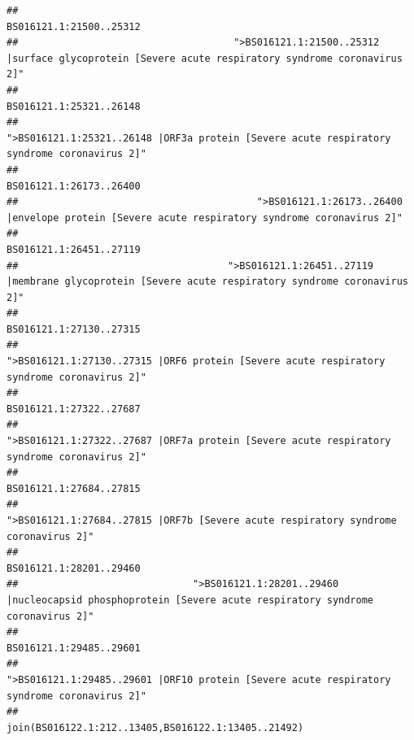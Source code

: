 \documentclass[
]{article}
\begin{document}
\begin{verbatim}
##                                                                                                                BS016121.1:21500..25312 
##                                     ">BS016121.1:21500..25312 |surface glycoprotein [Severe acute respiratory syndrome coronavirus 2]" 
##                                                                                                                BS016121.1:25321..26148 
##                                            ">BS016121.1:25321..26148 |ORF3a protein [Severe acute respiratory syndrome coronavirus 2]" 
##                                                                                                                BS016121.1:26173..26400 
##                                         ">BS016121.1:26173..26400 |envelope protein [Severe acute respiratory syndrome coronavirus 2]" 
##                                                                                                                BS016121.1:26451..27119 
##                                    ">BS016121.1:26451..27119 |membrane glycoprotein [Severe acute respiratory syndrome coronavirus 2]" 
##                                                                                                                BS016121.1:27130..27315 
##                                             ">BS016121.1:27130..27315 |ORF6 protein [Severe acute respiratory syndrome coronavirus 2]" 
##                                                                                                                BS016121.1:27322..27687 
##                                            ">BS016121.1:27322..27687 |ORF7a protein [Severe acute respiratory syndrome coronavirus 2]" 
##                                                                                                                BS016121.1:27684..27815 
##                                                    ">BS016121.1:27684..27815 |ORF7b [Severe acute respiratory syndrome coronavirus 2]" 
##                                                                                                                BS016121.1:28201..29460 
##                              ">BS016121.1:28201..29460 |nucleocapsid phosphoprotein [Severe acute respiratory syndrome coronavirus 2]" 
##                                                                                                                BS016121.1:29485..29601 
##                                            ">BS016121.1:29485..29601 |ORF10 protein [Severe acute respiratory syndrome coronavirus 2]" 
##                                                                                    join(BS016122.1:212..13405,BS016122.1:13405..21492) 

\end{verbatim}
\end{document}
